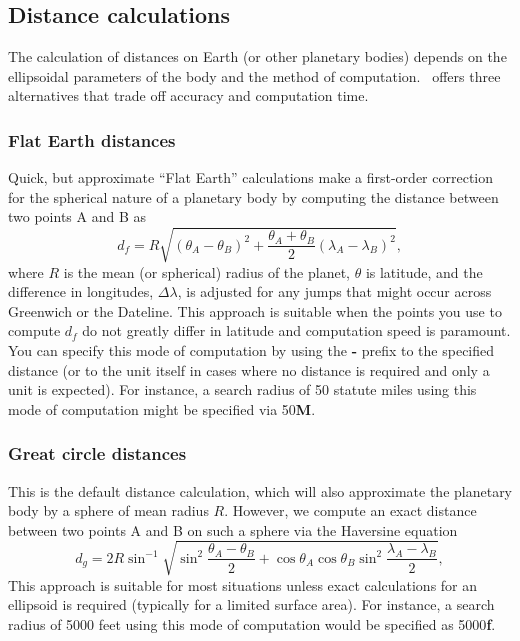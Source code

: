 \subsection{Distance calculations}

The calculation of distances on Earth (or other planetary bodies) depends on the
ellipsoidal parameters of the body and the method of computation.  \GMT\ offers
three alternatives that trade off accuracy and computation time.

\subsubsection{Flat Earth distances}
Quick, but approximate ``Flat Earth'' calculations make a first-order correction
for the spherical nature of a planetary body by computing the distance between
two points A and B as
\begin{equation}
	d_f = R \sqrt{(\theta_A - \theta_B)^2 + \frac{\theta_A + \theta_B}{2}(\lambda_A - \lambda_B)^2},
	\label{eq:flatearth}
\end{equation}
where $R$ is the mean (or spherical) radius of the planet, $\theta$ is latitude, and the difference in longitudes, $\Delta \lambda$,
is adjusted for any jumps that might occur across Greenwich or the Dateline.  This approach is suitable
when the points you use to compute $d_f$ do not greatly differ in latitude and computation
speed is paramount. You can specify this mode of computation by using the \textbf{-} prefix to
the specified distance (or to the unit itself in cases where no distance is required and only a unit is expected).
For instance, a search radius of 50 statute miles using this mode of computation might be specified via 50\textbf{M}.

\subsubsection{Great circle distances}
This is the default distance calculation, which will also approximate the planetary body by a sphere of mean
radius $R$. However, we compute an exact distance between two points A and B on such a sphere via
the Haversine equation
\begin{equation}
	d_g = 2R \sin^{-1}  {\sqrt{\sin^2\frac{\theta_A - \theta_B}{2} + \cos \theta_A \cos \theta_B \sin^2 \frac{\lambda_A - \lambda_B}{2}} },
	\label{eq:greatcircle}
\end{equation}
This approach is suitable for most situations unless exact calculations for an ellipsoid
is required (typically for a limited surface area).  For instance, a search radius of 5000 feet using this
mode of computation would be specified as 5000\textbf{f}.

